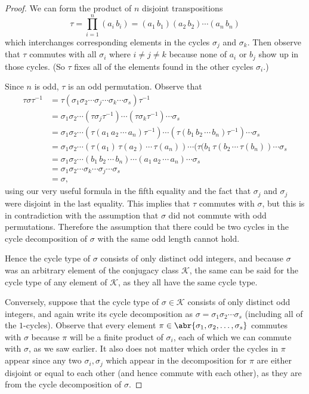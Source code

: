 \documentclass[11pt]{article}
\begin{document}
\begin{enumerate}
\begin{proof}
      We can form the product of $n$ disjoint transpositions \[\tau = \prod_{i = 1}^n (a_i \, b_i) = (a_1 \, b_1)(a_2 \, b_2)\cdots (a_n \, b_n)\]
      which interchanges corresponding elements in the cycles $\sigma_j$ and $\sigma_k$. Then observe that $\tau$ commutes with all $\sigma_i$ where $i\neq j\neq k$ because none of $a_i$ or $b_j$ show up in those cycles. (So $\tau$ fixes all of the elements found in the other cycles $\sigma_i$.)

      Since $n$ is odd, $\tau$ is an odd permutation. Observe that \begin{align*}
        \tau\sigma\tau^{-1} &= \tau (\sigma_1 \sigma_2 \cdots \sigma_j\cdots \sigma_k\cdots \sigma_s )  \tau^{-1}\\
        &= \sigma_1 \sigma_2 \cdots (\tau \sigma_j \tau^{-1}) \cdots (\tau \sigma_k\tau^{-1}) \cdots \sigma_s\\
        &= \sigma_1 \sigma_2 \cdots (\tau (a_{1}\, a_{2} \, \cdots\, a_{n}) \tau^{-1}) \cdots (\tau (b_{1}\, b_{2} \, \cdots\, b_{n})\tau^{-1}) \cdots \sigma_s\\
        &= \sigma_1 \sigma_2 \cdots  (\tau(a_{1})\, \tau(a_{2}) \, \cdots\, \tau(a_{n})) \cdots (\tau(b_{1}\, \tau(b_{2} \, \cdots\, \tau(b_{n})) \cdots \sigma_s\\
        &= \sigma_1 \sigma_2 \cdots (b_{1}\, b_{2} \, \cdots\, b_{n}) \cdots (a_{1}\, a_{2} \, \cdots\, a_{n}) \cdots \sigma_s\\
        &= \sigma_1 \sigma_2 \cdots \sigma_k\cdots \sigma_j\cdots \sigma_s \\
        &= \sigma,
      \end{align*} using our very useful formula in the fifth equality and the fact that $\sigma_j$ and $\sigma_j$ were disjoint in the last equality. This implies that $\tau$ commutes with $\sigma$, but this is in contradiction with the assumption that $\sigma$ did not commute with odd permutations. Therefore the assumption that there could be two cycles in the cycle decomposition of $\sigma$ with the same odd length cannot hold. 
      
      Hence the cycle type of $\sigma$ consists of only distinct odd integers, and because $\sigma$ was an arbitrary element of the conjugacy class $\mathcal{K}$, the same can be said for the cycle type of any element of $\mathcal{K}$, as they all have the same cycle type.

      Conversely, suppose that the cycle type of $\sigma\in \mathcal{K}$ consists of only distinct odd integers, and again write its cycle decomposition as $ \sigma = \sigma_1 \sigma_2 \cdots \sigma_s$ (including all of the $1$-cycles). Observe that every element $\pi\in \abr{\sigma_1, \sigma_2, \dots ,\sigma_s}$ commutes with $\sigma$ because $\pi$ will be a finite product of $\sigma_i$, each of which we can commute with $\sigma$, as we saw earlier. It also does not matter which order the cycles in $\pi$ appear since any two $\sigma_i, \sigma_j$ which appear in the decomposition for $\pi$ are either disjoint or equal to each other (and hence commute with each other), as they are from the cycle decomposition of $\sigma$.


\end{proof}
\end{enumerate}
\end{document}
